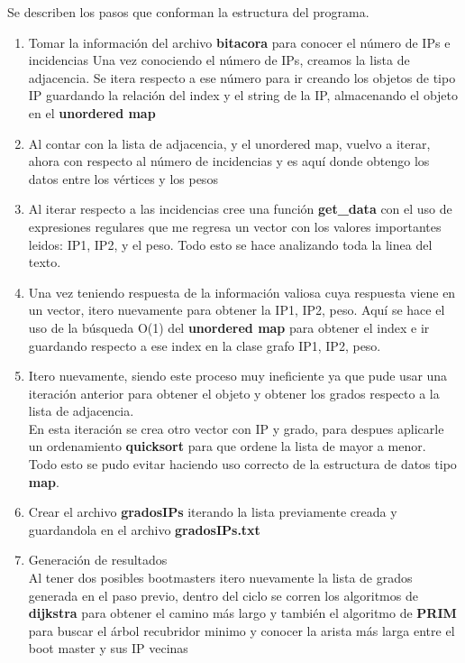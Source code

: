 \documentclass{article}
\begin{document}
  Se describen los pasos que conforman la estructura del programa.
  
  \begin{enumerate}
  \item Tomar la información del archivo \textbf{bitacora} para conocer el número de IPs e incidencias
    Una vez conociendo el número de IPs, creamos la lista de adjacencia. Se itera respecto a ese número para ir creando los objetos de tipo IP guardando la relación del index y el string de la IP, almacenando el objeto en el \textbf{unordered map}
 
  \item Al contar con la lista de adjacencia, y el unordered map, vuelvo a iterar, ahora con respecto al número de incidencias y es aquí donde obtengo los datos entre los vértices y los pesos
    
  \item Al iterar respecto a las incidencias cree una función \textbf{get\_data} con el uso de expresiones regulares que me regresa un vector con los valores importantes leidos: IP1, IP2, y el peso. Todo esto se hace analizando toda la linea del texto.
    
  \item Una vez teniendo respuesta de la información valiosa cuya respuesta viene en un vector, itero nuevamente para obtener la IP1, IP2, peso. Aquí se hace el uso de la búsqueda O(1) del \textbf{unordered map} para obtener el index e ir guardando respecto a ese index en la clase grafo IP1, IP2, peso.

  \item Itero nuevamente, siendo este proceso muy ineficiente ya que pude usar una iteración anterior para obtener el objeto y obtener los grados respecto a la lista de adjacencia.\\
    En esta iteración se crea otro vector con IP y grado, para despues aplicarle un ordenamiento \textbf{quicksort} para que ordene la lista de mayor a menor.\\
    Todo esto se pudo evitar haciendo uso correcto de la estructura de datos tipo \textbf{map}.

  \item Crear el archivo \textbf{gradosIPs} iterando la lista previamente creada y guardandola en el archivo \textbf{gradosIPs.txt}

  \item Generación de resultados\\
    Al tener dos posibles bootmasters itero nuevamente la lista de grados generada en el paso previo, dentro del ciclo se corren los algoritmos de \textbf{dijkstra} para obtener el camino más largo y también el algoritmo de \textbf{PRIM} para buscar el árbol recubridor minimo y conocer la arista más larga entre el boot master y sus IP vecinas
    
  \end{enumerate}
\end{document}
